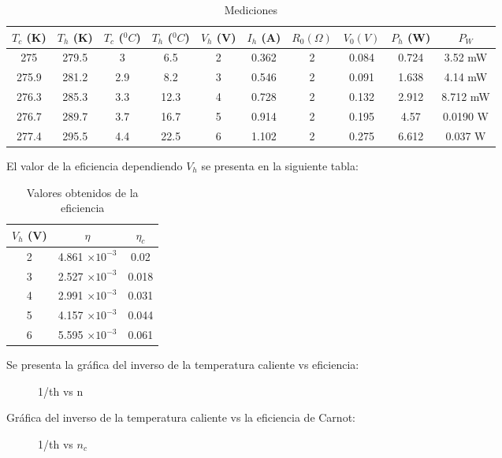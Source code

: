 \documentclass[12pt]{article}
\begin{document}
\begin{table}[H]
\centering
\begin{tabular}{|c|c|c|c|c|c|c|c|c|c|}
\hline
$T_c$ (K)&$T_h$ (K)&$T_c$ ($^0C$)&$T_h$ ($^0C$) & $V_h$ (V) & $I_h$ (A) &$R_0 (\Omega)$ & $V_0 (V)$ & $P_h$ (W) & $P_W$ \\ \hline
275&  279.5& 3& 6.5&  2 & 0.362& 2 &0.084 &0.724 & 3.52 mW\\ \hline
275.9 &281.2 &2.9 &8.2 & 3& 0.546& 2& 0.091& 1.638& 4.14 mW\\ \hline
276.3 &285.3 &3.3 &12.3 &4 & 0.728 &2 &0.132 & 2.912& 8.712 mW\\ \hline
276.7 &289.7 &3.7 &16.7 &5 & 0.914 &2 &0.195 &4.57 & 0.0190 W \\ \hline
277.4 &295.5 &4.4 &22.5 &6 & 1.102 &2 &0.275 & 6.612 & 0.037 W\\ \hline
\end{tabular}
\caption{Mediciones}
\label{tab:traIso}
\end{table}

El valor de la eficiencia dependiendo $V_h$ se presenta en la siguiente tabla:
\begin{table}[H]
\centering
\begin{tabular}{|c|c|c|}
\hline
$V_h$ (V)& $\eta$ & $\eta_c$ \\ \hline
2& 4.861 $ \times 10 ^{-3}$ & 0.02 \\ \hline
3&2.527 $ \times 10 ^{-3}$ & 0.018\\ \hline
4& 2.991 $ \times 10 ^{-3}$& 0.031\\ \hline
5& 4.157 $ \times 10 ^{-3}$& 0.044 \\ \hline
6& 5.595 $ \times 10 ^{-3}$& 0.061 \\ \hline
\end{tabular}
\caption{Valores obtenidos de la eficiencia}
\label{tab:taIso}
\end{table}

Se presenta la gráfica del inverso de la temperatura caliente vs eficiencia:

\begin{figure}[H]
\begin{center}
\caption{1/th vs n}
\label{one}
\end{center}
\end{figure}

Gráfica del inverso de la temperatura caliente vs la eficiencia de Carnot:

\begin{figure}[H]
\begin{center}
\caption{1/th vs $n_c$}
\label{one}
\end{center}
\end{figure}
\end{document}
